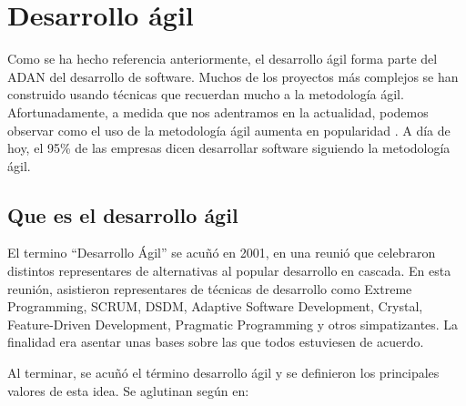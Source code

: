\documentclass[12pt]{report} %
\begin{document}
\section{Desarrollo ágil}

Como se ha hecho referencia anteriormente, el desarrollo ágil forma parte del
ADAN del desarrollo de software.  Muchos de los proyectos más complejos se han
construido usando técnicas que recuerdan mucho a la metodología ágil.
\cite{GW-PM} Afortunadamente, a medida que nos adentramos en la actualidad,
podemos observar como el uso de la metodología ágil aumenta en popularidad
\cite{Hoyada}.  A día de hoy, el 95\% de las empresas dicen desarrollar software
siguiendo la metodología ágil. \cite{stateofagile}

\subsection{Que es el desarrollo ágil}


El termino ``Desarrollo Ágil'' se acuñó en 2001, en una reunió que celebraron
distintos representares de alternativas al popular desarrollo en cascada.  En
esta reunión, asistieron representares de técnicas de desarrollo como Extreme
Programming, SCRUM, DSDM, Adaptive Software Development, Crystal, Feature-Driven
Development, Pragmatic Programming y otros simpatizantes.  La finalidad era
asentar unas bases sobre las que todos estuviesen de acuerdo.

Al terminar, se acuñó el término desarrollo ágil y se definieron los principales
valores de esta idea. Se aglutinan según \cite{agilePrinciples} en: 
\end{document}
